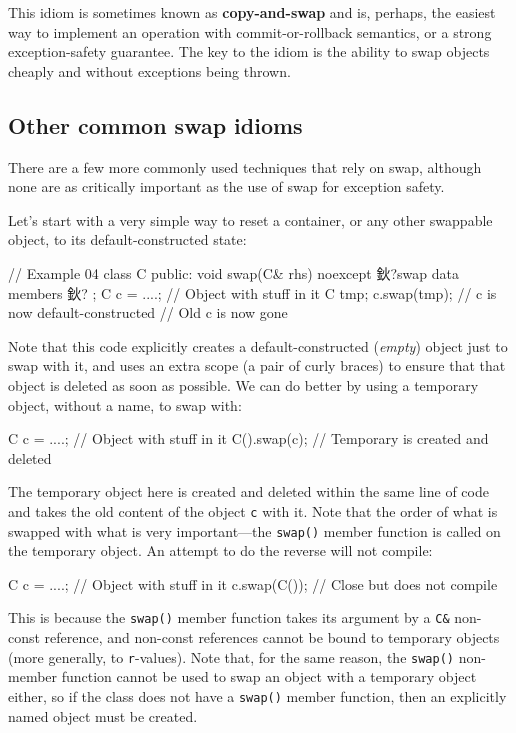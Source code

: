This idiom is sometimes known as \textbf{copy-and-swap} and is, perhaps, the easiest way to implement an operation with commit-or-rollback semantics, or a strong exception-safety guarantee. The key to the idiom is the ability to swap objects cheaply and without exceptions being thrown.

\subsection{Other common swap idioms}

There are a few more commonly used techniques that rely on swap, although none are as critically important as the use of swap for exception safety.

Let's start with a very simple way to reset a container, or any other swappable object, to its default-constructed state:

\begin{code}
// Example 04
class C {
    public:
    void swap(C& rhs) noexcept {
        鈥?swap data members 鈥?
    }
};
C c = ....;    // Object with stuff in it
{
  C tmp;
  c.swap(tmp);    // c is now default-constructed
}            // Old c is now gone
\end{code}

Note that this code explicitly creates a default-constructed (\emph{empty}) object just to swap with it, and uses an extra scope (a pair of curly braces) to ensure that that object is deleted as soon as possible. We can do better by using a temporary object, without a name, to swap with:

\begin{code}
C c = ....;    // Object with stuff in it
C().swap(c);    // Temporary is created and deleted
\end{code}

The temporary object here is created and deleted within the same line of code and takes the old content of the object \texttt{c} with it. Note that the order of what is swapped with what is very important---the \texttt{swap()} member function is called on the temporary object. An attempt to do the reverse will not compile:

\begin{code}
C c = ....;    // Object with stuff in it
c.swap(C());    // Close but does not compile
\end{code}

This is because the \texttt{swap()} member function takes its argument by a \texttt{C\&} non-const reference, and non-const references cannot be bound to temporary objects (more generally, to \texttt{r}-values). Note that, for the same reason, the \texttt{swap()} non-member function cannot be used to swap an object with a temporary object either, so if the class does not have a \texttt{swap()} member function, then an explicitly named object must be created.

